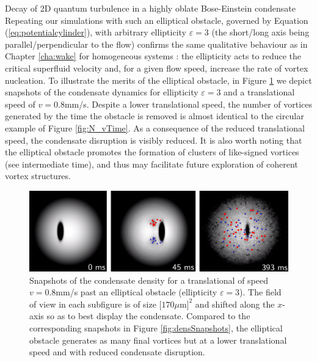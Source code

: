 \begin{chapter}{\label{cha:shin}Decay of 2D quantum turbulence in a highly oblate Bose-Einstein condensate}
Repeating our simulations with such an elliptical obstacle, governed by Equation (\ref{eq:potentialcylinder}), with arbitrary ellipticity $\varepsilon=3$ (the short/long axis being parallel/perpendicular to the flow) confirms the same qualitative behaviour as in Chapter \ref{cha:wake} for homogeneous systems \citep{stagg_parker_14}: the ellipticity acts to reduce the critical superfluid velocity and, for a given flow speed, increase the rate of vortex nucleation. To illustrate the merits of the elliptical obstacle, in Figure \ref{fig:ellipse} we depict snapshots of the condensate dynamics for ellipticity $\varepsilon=3$ and a translational speed of $v=0.8$mm/s. Despite a lower translational speed, the number of vortices generated by the time the obstacle is removed is almost identical to the circular example of Figure \ref{fig:N_vTime}.  As a consequence of the reduced translational speed, the condensate disruption is visibly reduced. It is also worth noting that the elliptical obstacle promotes the formation of clusters of like-signed vortices (see intermediate time), and thus may facilitate future exploration of coherent vortex structures.


\begin{figure}
\centering
\includegraphics[width=0.9\linewidth]{shin/fig6.png}
\caption{\label{fig:ellipse} Snapshots of the condensate density for a translational of speed $v=0.8$mm/s past an elliptical obstacle (ellipticity $\varepsilon=3$). The field of view in each subfigure is of size $[170\mu$m$]^2$ and shifted along the $x$-axis so as to best display the condensate.  Compared to the corresponding snapshots in Figure \ref{fig:densSnapshots}, the elliptical obstacle generates as many final vortices but at a lower translational speed and with reduced condensate disruption.
}
\end{figure}

\end{chapter}
